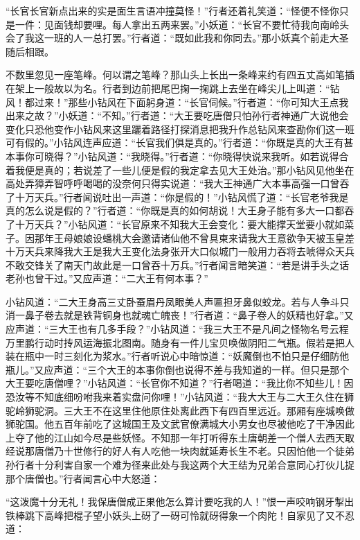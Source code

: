 \documentclass[12pt,UTF8]{ctexbook}
\begin{document}
“长官长官新点出来的实是面生言语冲撞莫怪！”行者还着礼笑道：“怪便不怪你只是一件：见面钱却要哩。每人拿出五两来罢。”小妖道：“长官不要忙待我向南岭头会了我这一班的人一总打罢。”行者道：“既如此我和你同去。”那小妖真个前走大圣随后相跟。

不数里忽见一座笔峰。何以谓之笔峰？那山头上长出一条峰来约有四五丈高如笔插在架上一般故以为名。行者到边前把尾巴掬一掬跳上去坐在峰尖儿上叫道：“钻风！都过来！”那些小钻风在下面躬身道：“长官伺候。”行者道：“你可知大王点我出来之故？”小妖道：“不知。”行者道：“大王要吃唐僧只怕孙行者神通广大说他会变化只恐他变作小钻风来这里躧着路径打探消息把我升作总钻风来查勘你们这一班可有假的。”小钻风连声应道：“长官我们俱是真的。”行者道：“你既是真的大王有甚本事你可晓得？”小钻风道：“我晓得。”行者道：“你晓得快说来我听。如若说得合着我便是真的；若说差了一些儿便是假的我定拿去见大王处治。”那小钻风见他坐在高处弄獐弄智呼呼喝喝的没奈何只得实说道：“我大王神通广大本事高强一口曾吞了十万天兵。”行者闻说吐出一声道：“你是假的！”小钻风慌了道：“长官老爷我是真的怎么说是假的？”行者道：“你既是真的如何胡说！大王身子能有多大一口都吞了十万天兵？”小钻风道：“长官原来不知我大王会变化：要大能撑天堂要小就如菜子。因那年王母娘娘设蟠桃大会邀请诸仙他不曾具柬来请我大王意欲争天被玉皇差十万天兵来降我大王是我大王变化法身张开大口似城门一般用力吞将去唬得众天兵不敢交锋关了南天门故此是一口曾吞十万兵。”行者闻言暗笑道：“若是讲手头之话老孙也曾干过。”又应声道：“二大王有何本事？”

小钻风道：“二大王身高三丈卧蚕眉丹凤眼美人声匾担牙鼻似蛟龙。若与人争斗只消一鼻子卷去就是铁背铜身也就魂亡魄丧！”行者道：“鼻子卷人的妖精也好拿。”又应声道：“三大王也有几多手段？”小钻风道：“我三大王不是凡间之怪物名号云程万里鹏行动时抟风运海振北图南。随身有一件儿宝贝唤做阴阳二气瓶。假若是把人装在瓶中一时三刻化为浆水。”行者听说心中暗惊道：“妖魔倒也不怕只是仔细防他瓶儿。”又应声道：“三个大王的本事你倒也说得不差与我知道的一样。但只是那个大王要吃唐僧哩？”小钻风道：“长官你不知道？”行者喝道：“我比你不知些儿！因恐汝等不知底细吩咐我来着实盘问你哩！”小钻风道：“我大大王与二大王久住在狮驼岭狮驼洞。三大王不在这里住他原住处离此西下有四百里远近。那厢有座城唤做狮驼国。他五百年前吃了这城国王及文武官僚满城大小男女也尽被他吃了干净因此上夺了他的江山如今尽是些妖怪。不知那一年打听得东土唐朝差一个僧人去西天取经说那唐僧乃十世修行的好人有人吃他一块肉就延寿长生不老。只因怕他一个徒弟孙行者十分利害自家一个难为径来此处与我这两个大王结为兄弟合意同心打伙儿捉那个唐僧也。”行者闻言心中大怒道：

“这泼魔十分无礼！我保唐僧成正果他怎么算计要吃我的人！”恨一声咬响钢牙掣出铁棒跳下高峰把棍子望小妖头上砑了一砑可怜就砑得象一个肉陀！自家见了又不忍道：
\end{document}
